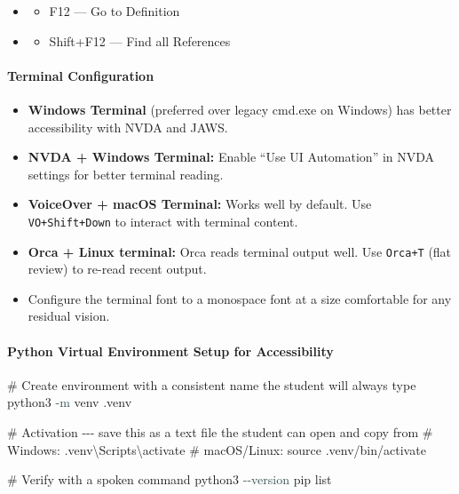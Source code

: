 \documentclass[
  justified,
  openright,
]{tufte-book}
\let\subsubsection\paragraph
\let\paragraph\paragraph
\newcommand{\AttributeTok}[1]{\textcolor{DarkSlateGray}{#1}}
\newcommand{\CommentTok}[1]{\textcolor{MidGray}{#1}}
\newcommand{\ExtensionTok}[1]{#1}
\newcommand{\NormalTok}[1]{#1}
\newenvironment{Shaded}{%
  \begin{snugshade}
}{%
  \end{snugshade}
}
\let\subsubsection\paragraph
\let\paragraph\paragraph
\providecommand{\tightlist}{%
  \setlength{\itemsep}{0pt}\setlength{\parskip}{0pt}}
\begin{document}
\begin{itemize}
\begin{itemize}
  \tightlist
  \item[$\square$]
    Alt+F12 --- Peek Definition
  \end{itemize}
\item
  \begin{itemize}
  \tightlist
  \item[$\square$]
    F12 --- Go to Definition
  \end{itemize}
\item
  \begin{itemize}
  \tightlist
  \item[$\square$]
    Shift+F12 --- Find all References
  \end{itemize}
\end{itemize}

\subsubsection{Terminal Configuration}\label{terminal-configuration}

\begin{itemize}
\tightlist
\item
  \textbf{Windows Terminal} (preferred over legacy cmd.exe on Windows)
  has better accessibility with NVDA and JAWS.
\item
  \textbf{NVDA + Windows Terminal:} Enable ``Use UI Automation'' in NVDA
  settings for better terminal reading.
\item
  \textbf{VoiceOver + macOS Terminal:} Works well by default. Use
  \texttt{VO+Shift+Down} to interact with terminal content.
\item
  \textbf{Orca + Linux terminal:} Orca reads terminal output well. Use
  \texttt{Orca+T} (flat review) to re-read recent output.
\item
  Configure the terminal font to a monospace font at a size comfortable
  for any residual vision.
\end{itemize}

\subsubsection{Python Virtual Environment Setup for
Accessibility}\label{python-virtual-environment-setup-for-accessibility}

\begin{Shaded}
\begin{Highlighting}[]
\CommentTok{\# Create environment with a consistent name the student will always type}
\ExtensionTok{python3} \AttributeTok{{-}m}\NormalTok{ venv .venv}

\CommentTok{\# Activation {-}{-}{-} save this as a text file the student can open and copy from}
\CommentTok{\# Windows: .venv\textbackslash{}Scripts\textbackslash{}activate}
\CommentTok{\# macOS/Linux: source .venv/bin/activate}

\CommentTok{\# Verify with a spoken command}
\ExtensionTok{python3} \AttributeTok{{-}{-}version}
\ExtensionTok{pip}\NormalTok{ list}
\end{Highlighting}
\end{Shaded}
\end{document}
